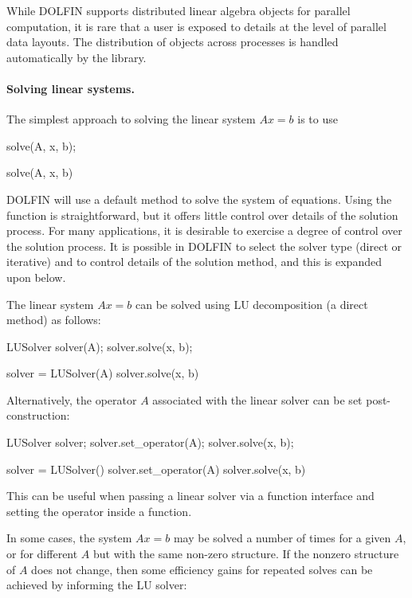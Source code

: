 While DOLFIN supports distributed linear algebra objects for parallel
computation, it is rare that a user is exposed to details at the level
of parallel data layouts. The distribution of objects across processes
is handled automatically by the library.

\paragraph{Solving linear systems.}

The simplest approach to solving the linear system $Ax = b$ is to use
%
\begin{c++}
solve(A, x, b);
\end{c++}
%
\begin{python}
solve(A, x, b)
\end{python}
%
DOLFIN will use a default method to solve the system of equations.
Using the function  is straightforward, but it offers little
control over details of the solution process. For many applications, it is
desirable to exercise a degree of control over the solution process.
It is possible in DOLFIN to select the solver type (direct or iterative)
and to control details of the solution method, and this is expanded upon
below.

The linear system $Ax = b$ can be solved using LU decomposition
(a direct method) as follows:
%
\begin{c++}
LUSolver solver(A);
solver.solve(x, b);
\end{c++}
%
\begin{python}
solver = LUSolver(A)
solver.solve(x, b)
\end{python}
%
Alternatively, the operator $A$ associated with the linear solver
can be set post-construction:
%
\begin{c++}
LUSolver solver;
solver.set_operator(A);
solver.solve(x, b);
\end{c++}
%
\begin{c++}
solver = LUSolver()
solver.set_operator(A)
solver.solve(x, b)
\end{c++}
%
This can be useful when passing a linear solver via a function
interface and setting the operator inside a function.

In some cases, the system $Ax = b$ may be solved a number of times for
a given $A$, or for different $A$ but with the same non-zero structure.
If the nonzero structure of $A$ does not change, then some efficiency
gains for repeated solves can be achieved by informing the LU solver:

